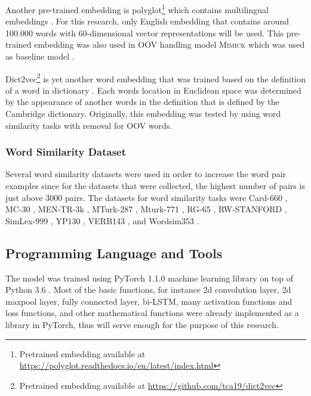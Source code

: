             Another pre-trained embedding is
            polyglot\footnote{Pretrained embedding available at
            \url{https://polyglot.readthedocs.io/en/latest/index.html}}
             which contains multilingual embeddings
            \citep{polyglot2013alrfou}. For this research, only
            English embedding that contains around 100.000 words with
            60-dimensional vector representations will be used. This
            pre-trained embedding was also used in OOV handling model
            \textsc{Mimick} which was used as baseline model
            \citep{mimicking2017Pinter}.

            Dict2vec\footnote{Pretrained embedding available at
            \url{https://github.com/tca19/dict2vec}} is yet another
            word embedding that was trained based on the definition of
            a word in dictionary \citep{dict2vect2017tissier}. Each
            words location in Euclidean space was determined by the
            appearance of another words in the definition that is
            defined by the Cambridge dictionary. Originally, this
            embedding was tested by using word similarity tasks with
            removal for OOV words.

        \subsubsection{Word Similarity Dataset}
            Several word similarity datasets were used in order to
            increase the word pair examples since for the datasets that were
            collected, the highest number of pairs is just above 3000
            pairs. The datasets for word similarity tasks were
            Card-660 \citep{card660:pilehvar-etal:2018}, MC-30
            \citep{mc30:strongContextualHypothesis}, MEN-TR-3k
            \citep{mentr3k:bruni-etal-2012-distributional}, MTurk-287
            \citep{mturk287:Radinsky:2011:WTC:1963405.1963455},
            Mturk-771
            \citep{mturk771:Halawi:2012:LLW:2339530.2339751}, RG-65
            \citep{rg65:Rubenstein:1965:CCS:365628.365657},
            RW-STANFORD \citep{rw:luong-etal-2013-better}, SimLex-999
            \citep{simlex999:hill2014}, YP130
            \citep{yp130:inproceedings}, VERB143
            \citep{vp143:baker-etal-2014-unsupervised}, and Wordsim353
            \citep{wordsim353:2002:PSC:503104.503110}.

    \subsection{Programming Language and Tools}
        The model was trained using PyTorch 1.1.0 machine learning
        library on top of Python 3.6 \citep{pytorch2017paszke}. Most
        of the basic functions, for instance 2d convolution layer, 2d
        maxpool layer, fully connected layer, bi-LSTM, many
        activation functions and loss functions, and other mathematical
        functions were already implemented as a library in PyTorch,
        thus will serve enough for the purpose of this research.    

